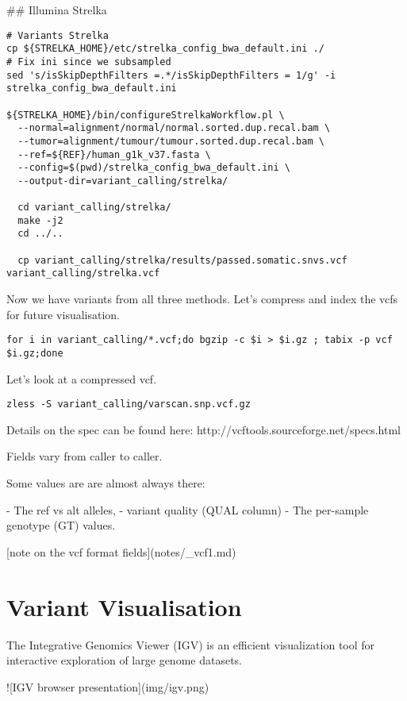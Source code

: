 ## Illumina Strelka

\begin{lstlisting}
# Variants Strelka
cp ${STRELKA_HOME}/etc/strelka_config_bwa_default.ini ./
# Fix ini since we subsampled
sed 's/isSkipDepthFilters =.*/isSkipDepthFilters = 1/g' -i strelka_config_bwa_default.ini

${STRELKA_HOME}/bin/configureStrelkaWorkflow.pl \
  --normal=alignment/normal/normal.sorted.dup.recal.bam \
  --tumor=alignment/tumour/tumour.sorted.dup.recal.bam \
  --ref=${REF}/human_g1k_v37.fasta \
  --config=$(pwd)/strelka_config_bwa_default.ini \
  --output-dir=variant_calling/strelka/

  cd variant_calling/strelka/
  make -j2
  cd ../..

  cp variant_calling/strelka/results/passed.somatic.snvs.vcf variant_calling/strelka.vcf
\end{lstlisting}

Now we have variants from all three methods. Let's compress and index the vcfs for future visualisation.

\begin{lstlisting}
for i in variant_calling/*.vcf;do bgzip -c $i > $i.gz ; tabix -p vcf $i.gz;done
\end{lstlisting}

Let's look at a compressed vcf.

\begin{lstlisting}
zless -S variant_calling/varscan.snp.vcf.gz
\end{lstlisting}
Details on the spec can be found here:
http://vcftools.sourceforge.net/specs.html

Fields vary from caller to caller.
 
Some values are are almost always there: 
 
   - The ref vs alt alleles, 
   - variant quality (QUAL column)
   - The per-sample genotype (GT) values.

[note on the vcf format fields](notes/_vcf1.md)


\newpage

\section{Variant Visualisation}

The Integrative Genomics Viewer (IGV) is an efficient visualization tool for interactive exploration of large genome datasets. 

![IGV browser presentation](img/igv.png)


